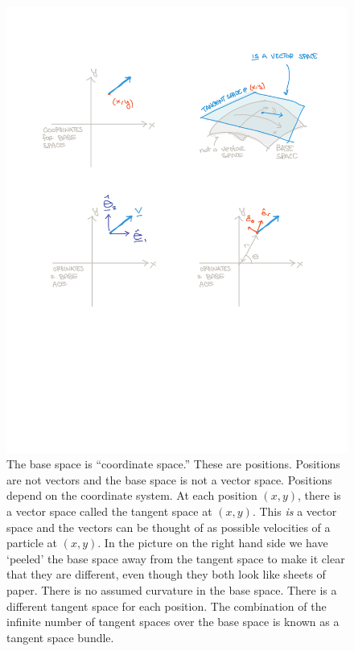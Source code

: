 \documentclass[12pt]{article}
\begin{document}
\begin{figure}[tb]
    \centering
    \includegraphics[width=.7\textwidth]{figures/base_space_tangent_space.pdf}
    \caption{The base space is ``coordinate space.'' These are positions. Positions are not vectors and the base space is not a vector space. Positions depend on the coordinate system. At each position $(x,y)$, there is a vector space called the tangent space at $(x,y)$. This \emph{is} a vector space and the vectors can be thought of as possible velocities of a particle at $(x,y)$. In the picture on the right hand side we have `peeled' the base space away from the tangent space to make it clear that they are different, even though they both look like sheets of paper. There is no assumed curvature in the base space. There is a different tangent space for each position. The combination of the infinite number of tangent spaces over the base space is known as a tangent space bundle.}
    \label{fig:tangent:space:polar}
\end{figure}
\end{document}
